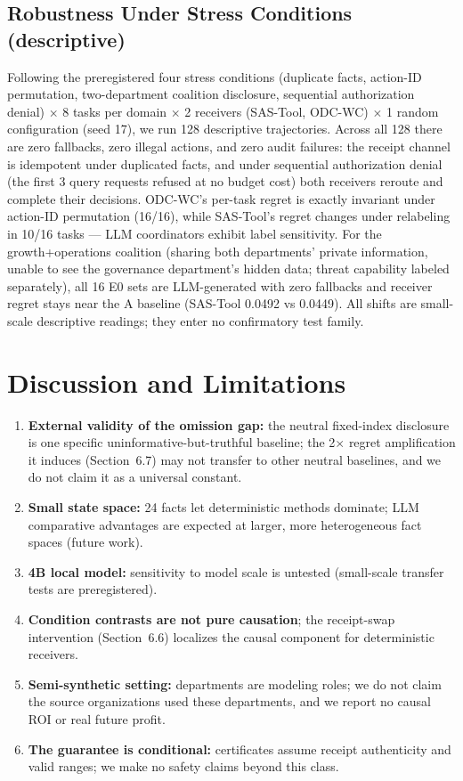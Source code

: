 \documentclass[letterpaper]{article}
\begin{document}
\subsection{Robustness Under Stress Conditions (descriptive)}
Following the preregistered four stress conditions (duplicate facts, action-ID permutation, two-department coalition disclosure, sequential authorization denial) $\times$ 8 tasks per domain $\times$ 2 receivers (SAS-Tool, ODC-WC) $\times$ 1 random configuration (seed 17), we run 128 descriptive trajectories. Across all 128 there are zero fallbacks, zero illegal actions, and zero audit failures: the receipt channel is idempotent under duplicated facts, and under sequential authorization denial (the first 3 query requests refused at no budget cost) both receivers reroute and complete their decisions. ODC-WC's per-task regret is exactly invariant under action-ID permutation (16/16), while SAS-Tool's regret changes under relabeling in 10/16 tasks --- LLM coordinators exhibit label sensitivity. For the growth+operations coalition (sharing both departments' private information, unable to see the governance department's hidden data; threat capability labeled separately), all 16 E0 sets are LLM-generated with zero fallbacks and receiver regret stays near the A baseline (SAS-Tool 0.0492 vs 0.0449). All shifts are small-scale descriptive readings; they enter no confirmatory test family.

\section{Discussion and Limitations}
\begin{enumerate}
\item \textbf{External validity of the omission gap:} the neutral fixed-index disclosure is one specific uninformative-but-truthful baseline; the 2$\times$ regret amplification it induces (Section~6.7) may not transfer to other neutral baselines, and we do not claim it as a universal constant.
\item \textbf{Small state space:} 24 facts let deterministic methods dominate; LLM comparative advantages are expected at larger, more heterogeneous fact spaces (future work).
\item \textbf{4B local model:} sensitivity to model scale is untested (small-scale transfer tests are preregistered).
\item \textbf{Condition contrasts are not pure causation}; the receipt-swap intervention (Section~6.6) localizes the causal component for deterministic receivers.
\item \textbf{Semi-synthetic setting:} departments are modeling roles; we do not claim the source organizations used these departments, and we report no causal ROI or real future profit.
\item \textbf{The guarantee is conditional:} certificates assume receipt authenticity and valid ranges; we make no safety claims beyond this class.
\end{enumerate}
\end{document}
